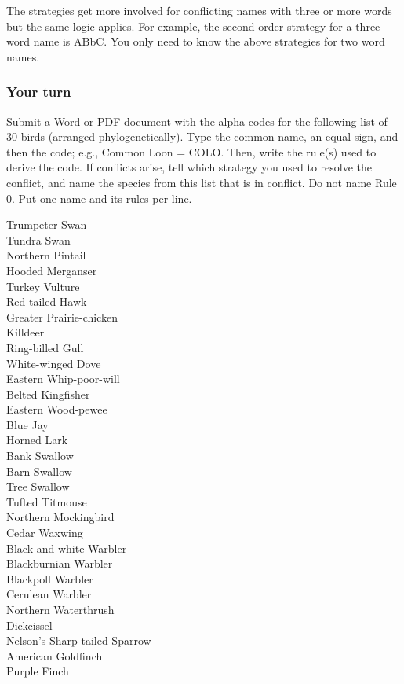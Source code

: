 \documentclass[11pt]{article}
\begin{document}
The strategies get more involved for conflicting names with three or more words but the same logic applies. For example, the second order strategy for a three-word name is ABbC. You only need to know the above strategies for two word names.

\newpage

\subsubsection*{Your turn}

Submit a Word or PDF document with the alpha codes for the following list of 30 birds (arranged phylogenetically). Type the common name, an equal sign, and then the code; e.g., Common Loon = COLO.  Then, write the rule(s) used to derive the code. If conflicts arise, tell which  strategy you used to resolve the conflict, and name the species from this list that is in conflict. Do not name Rule 0. Put one name and its rules per line. 

\begin{multicols}{2}
Trumpeter Swan\\
Tundra Swan\\
Northern Pintail\\
Hooded Merganser\\
Turkey Vulture\\
Red-tailed Hawk\\
Greater Prairie-chicken\\
Killdeer\\
Ring-billed Gull\\
White-winged Dove\\
Eastern Whip-poor-will\\
Belted Kingfisher\\
Eastern Wood-pewee\\
Blue Jay\\
Horned Lark\\
Bank Swallow\\
Barn Swallow\\
Tree Swallow\\
Tufted Titmouse\\
Northern Mockingbird\\
Cedar Waxwing\\
Black-and-white Warbler\\
Blackburnian Warbler\\
Blackpoll Warbler\\
Cerulean Warbler\\
Northern Waterthrush\\
Dickcissel\\
Nelson's Sharp-tailed Sparrow\\
American Goldfinch\\
Purple Finch
\end{multicols}
\end{document}
